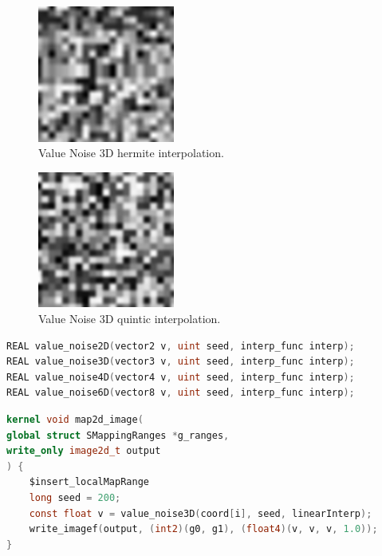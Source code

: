 \begin{figure}[h]
\centering
\includegraphics[width=0.4\textwidth]{out/noise_functions/value_noise3D_hermiteInterp.png}
\caption{Value Noise 3D hermite interpolation.}
\label{fig:value_noise3D_hermiteInterp}
\end{figure}

\begin{figure}[h]
\centering
\includegraphics[width=0.4\textwidth]{out/noise_functions/value_noise2D_quinticInterp.png}
\caption{Value Noise 3D quintic interpolation.}
\label{fig:value_noise2D_quinticInterp}
\end{figure}

\begin{lstlisting}[caption={Definition of value noise functions},label={lst:value_noise_definition},language=OpenCL]
REAL value_noise2D(vector2 v, uint seed, interp_func interp);
REAL value_noise3D(vector3 v, uint seed, interp_func interp);
REAL value_noise4D(vector4 v, uint seed, interp_func interp);
REAL value_noise6D(vector8 v, uint seed, interp_func interp);
\end{lstlisting}

\begin{lstlisting}[caption={Example for value noise functions},label={lst:value_noise_example},language=OpenCL]
kernel void map2d_image(
global struct SMappingRanges *g_ranges,
write_only image2d_t output
) {
    $insert_localMapRange
    long seed = 200;
    const float v = value_noise3D(coord[i], seed, linearInterp);
    write_imagef(output, (int2)(g0, g1), (float4)(v, v, v, 1.0));
}
\end{lstlisting}

